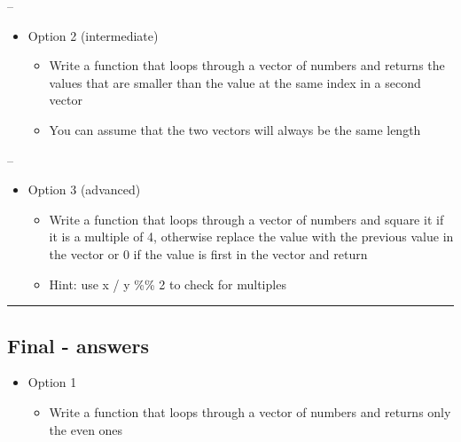 \documentclass[]{article}
\providecommand{\tightlist}{%
  \setlength{\itemsep}{0pt}\setlength{\parskip}{0pt}}
\begin{document}
--

\begin{itemize}
\tightlist
\item
  Option 2 (intermediate)

  \begin{itemize}
  \tightlist
  \item
    Write a function that loops through a vector of numbers and returns
    the values that are smaller than the value at the same index in a
    second vector
  \item
    You can assume that the two vectors will always be the same length
  \end{itemize}
\end{itemize}

--

\begin{itemize}
\tightlist
\item
  Option 3 (advanced)

  \begin{itemize}
  \tightlist
  \item
    Write a function that loops through a vector of numbers and square
    it if it is a multiple of 4, otherwise replace the value with the
    previous value in the vector or 0 if the value is first in the
    vector and return
  \item
    Hint: use x / y \%\% 2 to check for multiples
  \end{itemize}
\end{itemize}

\begin{center}\rule{0.5\linewidth}{\linethickness}\end{center}

\hypertarget{final---answers}{%
\subsection{Final - answers}\label{final---answers}}

\begin{itemize}
\tightlist
\item
  Option 1

  \begin{itemize}
  \tightlist
  \item
    Write a function that loops through a vector of numbers and returns
    only the even ones
  \end{itemize}
\end{itemize}
\end{document}
